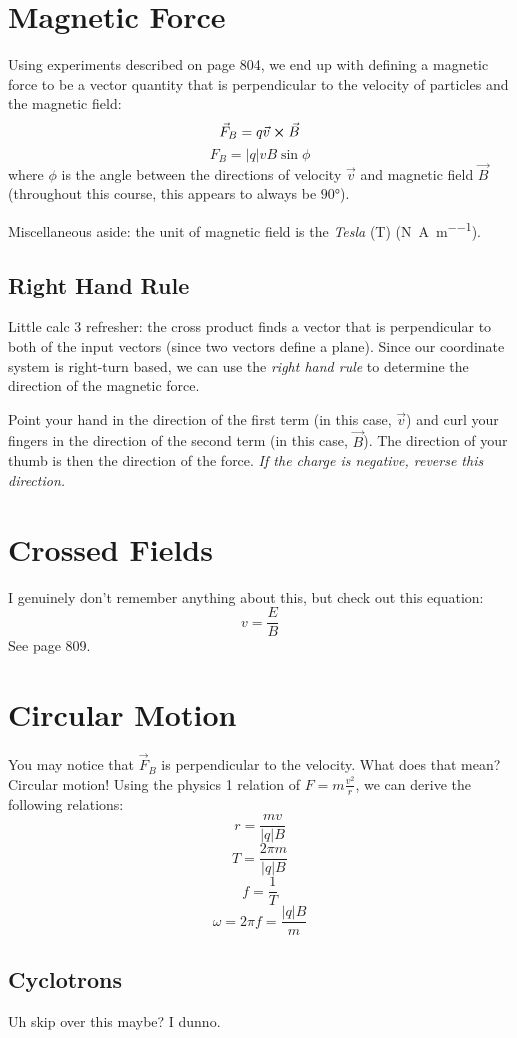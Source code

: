 \documentclass[]{article}
\begin{document}
\section{Magnetic Force}
Using experiments described on page 804, we end up with defining a magnetic force to be a vector quantity that is perpendicular to the velocity of particles and the magnetic field:
\[ \vec{F}_B = q\vec{v} \cross \vec{B} \]
\[ F_B = \left|q\right| v B \sin \phi \]
where $ \phi $ is the angle between the directions of velocity $ \vec{v} $ and magnetic field $ \vec{B} $ (throughout this course, this appears to always be $ \ang{90} $).

Miscellaneous aside: the unit of magnetic field is the \emph{Tesla} (\unit{\tesla}) (\unit{\newton\per\ampere\per\meter}).

\subsection{Right Hand Rule}
Little calc 3 refresher: the cross product finds a vector that is perpendicular to both of the input vectors (since two vectors define a plane). Since our coordinate system is right-turn based, we can use the \emph{right hand rule} to determine the direction of the magnetic force.

Point your hand in the direction of the first term (in this case, $ \vec{v} $) and curl your fingers in the direction of the second term (in this case, $ \vec{B} $). The direction of your thumb is then the direction of the force. \emph{If the charge is negative, reverse this direction.}

\section{Crossed Fields}
I genuinely don't remember anything about this, but check out this equation:
\[ v = \frac{E}{B} \]
See page 809.

\section{Circular Motion}
You may notice that $ \vec{F}_B $ is perpendicular to the velocity. What does that mean? Circular motion! Using the physics 1 relation of $ F = m \frac{v^2}{r} $, we can derive the following relations:
\[ r = \frac{mv}{\left|q\right|B} \]
\[ T = \frac{2\pi m}{\left|q\right|B} \]
\[ f = \frac{1}{T} \]
\[ \omega = 2 \pi f = \frac{\left|q\right|B}{m} \]

\subsection{Cyclotrons}
Uh skip over this maybe? I dunno.
\end{document}
